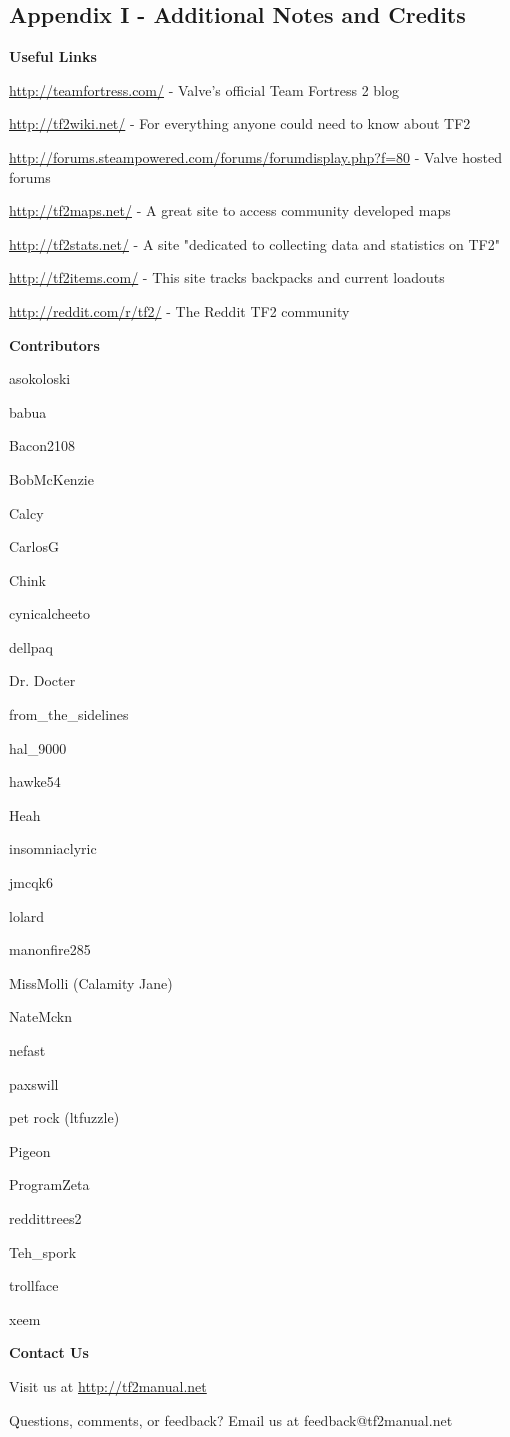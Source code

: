 \subsection{Appendix I - Additional Notes and Credits}
\newenvironment{packed_item}{
\begin{itemize}
  \setlength{\itemsep}{1pt}
  \setlength{\parskip}{0pt}
  \setlength{\parsep}{0pt}
}{\end{itemize}}


{\bf Useful Links}

\url{http://teamfortress.com/} - Valve's official Team Fortress 2 blog

\url{http://tf2wiki.net/} - For everything anyone could need to know about TF2

\url{http://forums.steampowered.com/forums/forumdisplay.php?f=80} - Valve hosted forums 

\url{http://tf2maps.net/} - A great site to access community developed maps

\url{http://tf2stats.net/} - A site "dedicated to collecting data and statistics on TF2"

\url{http://tf2items.com/} - This site tracks backpacks and current loadouts

\url{http://reddit.com/r/tf2/} - The Reddit TF2 community



\vspace{40 mm}


{\bf Contributors}

\begin{multicols}{3}
asokoloski

babua

Bacon2108

BobMcKenzie

Calcy

CarlosG

Chink

cynicalcheeto

dellpaq

Dr. Docter

from\_the\_sidelines

hal\_9000

hawke54

Heah

insomniaclyric

jmcqk6

lolard

manonfire285

MissMolli (Calamity Jane)

NateMckn

nefast

paxswill

pet rock (ltfuzzle)

Pigeon

ProgramZeta

reddittrees2

Teh\_spork

trollface

xeem
 
\end{multicols}
\newpage %
{\bf Contact Us}

Visit us at \url{http://tf2manual.net}

Questions, comments, or feedback? Email us at feedback@tf2manual.net
